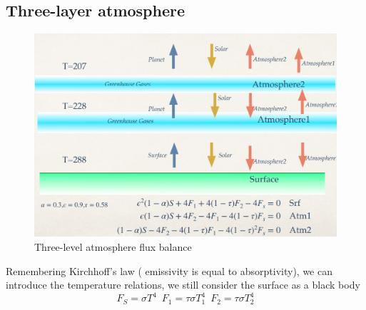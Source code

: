 \subsection{Three-layer atmosphere}
\begin{figure}[h!]
	\centering
	\includegraphics[width=0.65\linewidth]{uploads/Screenshot 2024-11-20 121339.png}
	\caption{Three-level atmosphere flux balance}
	\label{fig:three level}
\end{figure}
Remembering Kirchhoff’s law ( emissivity is equal to absorptivity), we
can introduce the temperature relations, we still consider the surface as a
black body $$F_S=\sigma T^4 \,\,\, F_1=\tau\sigma T_1^4 \,\,\, F_2=\tau\sigma T_2^4$$

